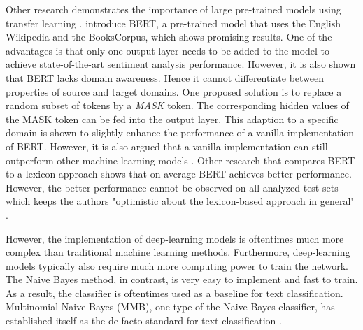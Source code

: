 \documentclass[11pt, a4paper]{article}
\begin{document}
Other research demonstrates the importance of large pre-trained models using transfer learning \citep{deng2009transferlearning}.
\cite{devlin2019bert} introduce BERT, a pre-trained model that uses the English Wikipedia and the BooksCorpus, which shows promising results.
One of the advantages is that only one output layer needs to be added to the model to achieve state-of-the-art sentiment analysis performance.
However, it is also shown that BERT lacks domain awareness. Hence it cannot differentiate between properties of source and target domains. One
proposed solution is to replace a random subset of tokens by a \emph{MASK} token. The corresponding hidden values of the MASK token can be fed
into the output layer. This adaption to a specific domain is shown to slightly enhance the performance of a vanilla implementation of BERT. However,
it is also argued that a vanilla implementation can still outperform other machine learning models \citep{Du2020AdversarialAD}. Other research that compares BERT to a
lexicon approach shows that on average BERT achieves better performance. However, the better performance cannot be observed on all analyzed test sets
which keeps the authors "optimistic about the lexicon-based approach in general" \citep{kotelnikova2021lexiconbased}. %

However, the implementation of deep-learning models is oftentimes much more complex than traditional machine learning methods. Furthermore, deep-learning models typically
also require much more computing power to train the network. The Naive Bayes method, in contrast, is very easy to implement and fast to train. As a
result, the classifier is oftentimes used as a baseline for text classification. Multinomial Naive Bayes (MMB), one type of the Naive Bayes classifier, has established
itself as the de-facto standard for text classification \citep{abbas2019mnb}.
\end{document}
